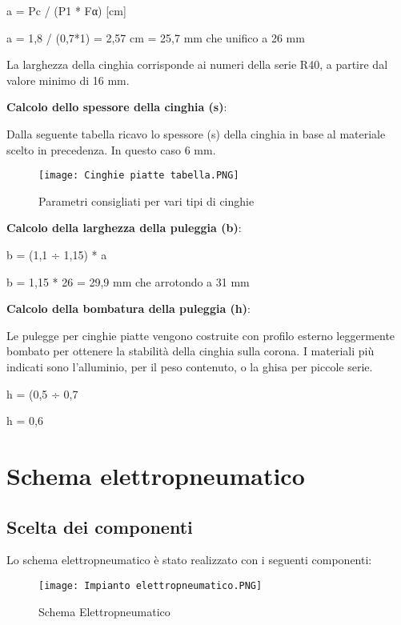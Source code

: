 \documentclass{report}
\begin{document}
\begin{description}
a = Pc / (P1 * Fα) [cm]

a = 1,8 / (0,7*1) = 2,57 cm = 25,7 mm che unifico a 26 mm

La larghezza della cinghia corrisponde ai numeri della serie R40, a partire dal valore minimo di 16 mm.

\item \textbf{Calcolo dello spessore della cinghia (s)}:

Dalla seguente tabella ricavo lo spessore (s) della cinghia in base al materiale scelto in precedenza. In questo caso 6 mm.

\begin{figure}[H] %
    \centering
    \texttt{[image: Cinghie piatte tabella.PNG]}
    \caption{Parametri consigliati per vari tipi di cinghie}
    \label{fig:my_label}
\end{figure}

\item \textbf{Calcolo della larghezza della puleggia (b)}:

b = (1,1 ÷ 1,15) * a

b = 1,15 * 26 = 29,9 mm che arrotondo a 31 mm

\item \textbf{Calcolo della bombatura della puleggia (h)}:

Le pulegge per cinghie piatte vengono costruite con profilo esterno leggermente bombato per ottenere la stabilità della cinghia sulla corona. I materiali più indicati sono l’alluminio, per il peso contenuto, o la ghisa per piccole serie.

h = (0,5 ÷ 0,7%

h = 0,6%


\end{description}


\section{Schema elettropneumatico}
\subsection{Scelta dei componenti}

Lo schema elettropneumatico è stato realizzato con i seguenti componenti:

\begin{figure}[H] %
    \centering
    \texttt{[image: Impianto elettropneumatico.PNG]}
    \caption{Schema Elettropneumatico}
    \label{fig:my_label}
\end{figure}
\end{document}
